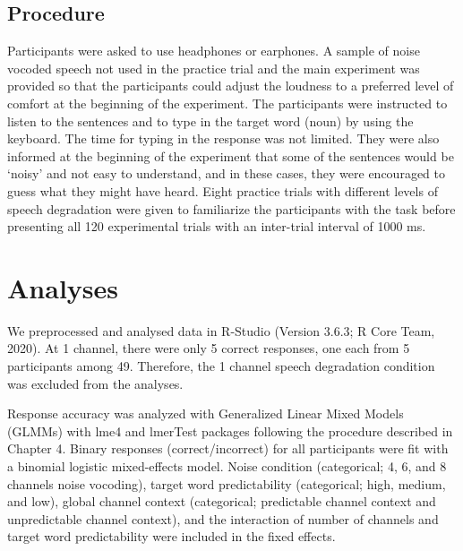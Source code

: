 \documentclass[a4paper, nobind]{templates/ociamthesis}
\begin{document}
\hypertarget{procedure}{%
\subsection{Procedure}\label{procedure}}

Participants were asked to use headphones or earphones.
A sample of noise vocoded speech not used in the practice trial and the main experiment was provided so that the participants could adjust the loudness to a preferred level of comfort at the beginning of the experiment.
The participants were instructed to listen to the sentences and to type in the target word (noun) by using the keyboard.
The time for typing in the response was not limited.
They were also informed at the beginning of the experiment that some of the sentences would be `noisy' and not easy to understand, and in these cases, they were encouraged to guess what they might have heard.
Eight practice trials with different levels of speech degradation were given to familiarize the participants with the task before presenting all 120 experimental trials with an inter-trial interval of 1000 ms.

\hypertarget{analyses}{%
\section{Analyses}\label{analyses}}

We preprocessed and analysed data in R-Studio (Version 3.6.3; R Core Team, 2020).
At 1 channel, there were only 5 correct responses, one each from 5 participants among 49.
Therefore, the 1 channel speech degradation condition was excluded from the analyses.

Response accuracy was analyzed with Generalized Linear Mixed Models (GLMMs) with lme4 \autocite{Bates2015} and lmerTest \autocite{Kuznetsova2017} packages following the procedure described in Chapter 4.
Binary responses (correct/incorrect) for all participants were fit with a binomial logistic mixed-effects model\autocite{Jaeger2006,Jaeger2008}.
Noise condition (categorical; 4, 6, and 8 channels noise vocoding), target word predictability (categorical; high, medium, and low), global channel context (categorical; predictable channel context and unpredictable channel context), and the interaction of number of channels and target word predictability were included in the fixed effects.
\end{document}
